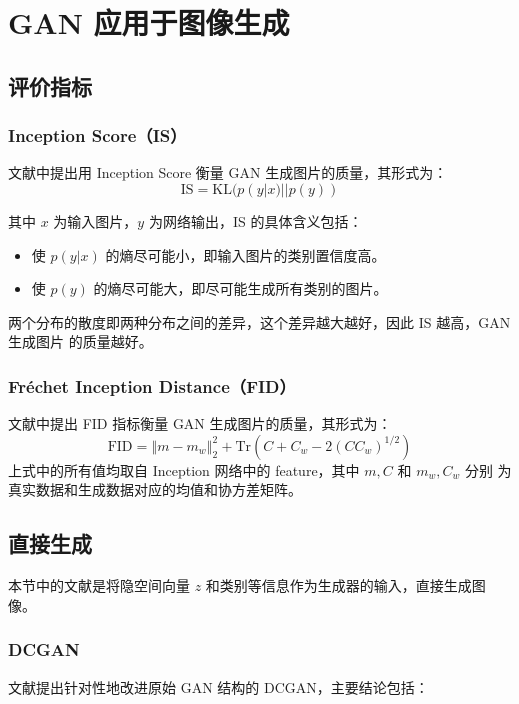 \chapter{GAN 应用于图像生成}

\section{评价指标}

\subsection{Inception Score（IS）}
文献中提出用 Inception Score 衡量 GAN 生成图片的质量，其形式为：
\begin{equation}
  \label{equ:IS-score}
  \mathrm{IS} = \mathrm{KL}(p(y|x) || p(y))
\end{equation}

其中 $x$ 为输入图片，$y$ 为网络输出，IS 的具体含义包括：

\begin{itemize}
  \item 使 $p(y|x)$ 的熵尽可能小，即输入图片的类别置信度高。
  \item 使 $p(y)$ 的熵尽可能大，即尽可能生成所有类别的图片。
\end{itemize}

两个分布的散度即两种分布之间的差异，这个差异越大越好，因此 IS 越高，GAN 生成图片
的质量越好。

\subsection{Fréchet Inception Distance（FID）}
文献中提出 FID 指标衡量 GAN 生成图片的质量，其形式为：
\begin{equation}
  \label{equ:FID}
  \mathrm{FID} = \left\Vert m-m_w \right\Vert _{2}^2 + \mathrm{Tr} \left( C + C_w - 2 \left( C C_w \right)^{1/2} \right)
\end{equation}
上式中的所有值均取自 Inception 网络中的 feature，其中 $m, C$ 和 $m_w, C_w$ 分别
为真实数据和生成数据对应的均值和协方差矩阵。

\section{直接生成}
本节中的文献是将隐空间向量 $z$ 和类别等信息作为生成器的输入，直接生成图像。

\subsection{DCGAN}
文献提出针对性地改进原始 GAN 结构的 DCGAN，主要结论包括：

